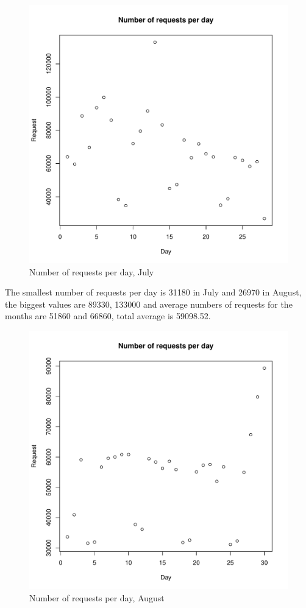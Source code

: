 \documentclass[english]{article}
\begin{document}
\begin{figure}[H]
\centerline{\includegraphics{Weblogs/Jul/NumberOfRequestsPerDay.pdf}}
\caption{Number of requests per day, July}
\end{figure}
The smallest number of requests per day is 31180 in July and 26970 in August, the biggest values are 89330, 133000 and average numbers of requests for the months are 51860 and 66860, total average is 59098.52.
\begin{figure}[H]
\centerline{\includegraphics{Weblogs/Aug/NumberOfRequestsPerDay.pdf}}
\caption{Number of requests per day, August}
\end{figure}
\end{document}

